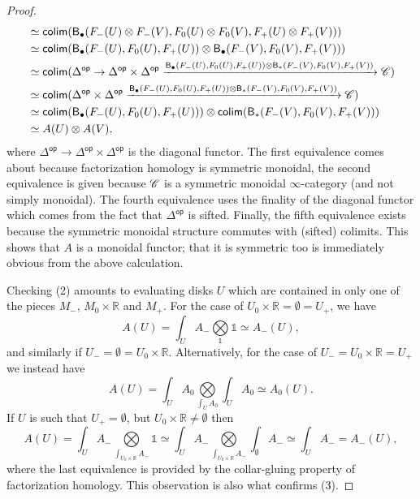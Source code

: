 \documentclass[../text]{subfiles}
\begin{document}
\begin{proof}
\begin{align}
        &\simeq \mathsf{colim} (\mathsf{B}_{\bullet} (F_-(U) \otimes F_-(V), F_0(U) \otimes F_0(V), F_+(U) \otimes F_+(V)))\notag\\
        &\simeq \mathsf{colim} (\mathsf{B}_{\bullet} (F_-(U), F_0(U), F_+(U)) \otimes \mathsf{B}_{\bullet} (F_-(V), F_0(V), F_+(V)))\notag\\
        &\simeq \mathsf{colim} (\Delta^{\mathsf{op}} \rightarrow \Delta^{\mathsf{op}} \times \Delta^{\mathsf{op}} \xrightarrow{\mathsf{B}_{\bullet} (F_-(U), F_0(U), F_+(U)) \otimes \mathsf{B}_{*} (F_-(V), F_0(V), F_+(V))} \mathscr{C})\notag\\
        &\simeq \mathsf{colim} (\Delta^{\mathsf{op}} \times \Delta^{\mathsf{op}} \xrightarrow{\mathsf{B}_{\bullet} (F_-(U), F_0(U), F_+(U)) \otimes \mathsf{B}_{*} (F_-(V), F_0(V), F_+(V))} \mathscr{C})\notag\\
        &\simeq \mathsf{colim} (\mathsf{B}_{\bullet} (F_-(U), F_0(U), F_+(U))) \otimes \mathsf{colim} (\mathsf{B}_{*} (F_-(V), F_0(V), F_+(V)))\notag\\
        &\simeq A(U) \otimes A(V),
    \end{align}
    where $\Delta^{\mathsf{op}} \rightarrow \Delta^{\mathsf{op}} \times \Delta^{\mathsf{op}}$ is the diagonal functor. The first equivalence comes about because factorization homology is symmetric monoidal, the second equivalence is given because $\mathscr{C}$ is a symmetric monoidal $\infty$-category (and not simply monoidal). The fourth equivalence uses the finality of the diagonal functor which comes from the fact that $\Delta^{\mathsf{op}}$ is sifted. Finally, the fifth equivalence exists because the symmetric monoidal structure commutes with (sifted) colimits. This shows that $A$ is a monoidal functor; that it is symmetric too is immediately obvious from the above calculation. 
    
    Checking (2) amounts to evaluating disks $U$ which are contained in only one of the pieces $M_-$, $M_0 \times \mathbb{R}$ and $M_+$. For the case of $U_0 \times \mathbb{R} = \emptyset = U_+$, we have
    \begin{equation}
        A(U) = \int_{U} A_- \bigotimes\limits_{\mathbb{1}} \mathbb{1} \simeq A_- (U),
    \end{equation}
    and similarly if $U_- = \emptyset = U_0 \times \mathbb{R}$. Alternatively, for the case of $U_- = U_0 \times \mathbb{R} = U_+$ we instead have
    \begin{equation}
        A(U) = \int_U A_0 \bigotimes\limits_{\int_{U} A_0} \int_U A_0 \simeq A_0(U).
    \end{equation}
    If $U$ is such that $U_+ = \emptyset$, but $U_0 \times \mathbb{R} \neq \emptyset$ then
    \begin{equation}
        A(U) = \int_U A_- \bigotimes\limits_{\int_{U_0 \times \mathbb{R}} A_-} \mathbb{1} \simeq \int_U A_- \bigotimes\limits_{\int_{U_0 \times \mathbb{R}} A_-} \int_{\emptyset} A_- \simeq \int_{U} A_- = A_-(U),
    \end{equation}
    where the last equivalence is provided by the collar-gluing property of factorization homology. This observation is also what confirms (3).


\end{proof}
\end{document}
